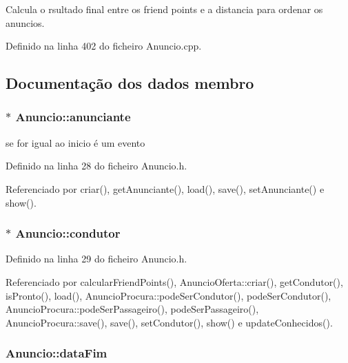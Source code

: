 Calcula o rsultado final entre os friend points e a distancia para ordenar os anuncios. 



Definido na linha 402 do ficheiro Anuncio.\+cpp.



\subsection{Documentação dos dados membro}
\hypertarget{class_anuncio_a58250bfc8ab82d4308839b1e26213a0f}{
\subsubsection[{anunciante}]{$\ast$ Anuncio\+::anunciante\hspace{0.3cm}{\ttfamily [protected]}}}\label{class_anuncio_a58250bfc8ab82d4308839b1e26213a0f}


se for igual ao inicio é um evento 



Definido na linha 28 do ficheiro Anuncio.\+h.



Referenciado por criar(), get\+Anunciante(), load(), save(), set\+Anunciante() e show().

\hypertarget{class_anuncio_a8771818ef0855c6b70e2aca6c89e3177}{
\subsubsection[{condutor}]{$\ast$ Anuncio\+::condutor\hspace{0.3cm}{\ttfamily [protected]}}}\label{class_anuncio_a8771818ef0855c6b70e2aca6c89e3177}


Definido na linha 29 do ficheiro Anuncio.\+h.



Referenciado por calcular\+Friend\+Points(), Anuncio\+Oferta\+::criar(), get\+Condutor(), is\+Pronto(), load(), Anuncio\+Procura\+::pode\+Ser\+Condutor(), pode\+Ser\+Condutor(), Anuncio\+Procura\+::pode\+Ser\+Passageiro(), pode\+Ser\+Passageiro(), Anuncio\+Procura\+::save(), save(), set\+Condutor(), show() e update\+Conhecidos().

\hypertarget{class_anuncio_ac3b9182cc541cb68215f8aa09fb0e11a}{
\subsubsection[{data\+Fim}]{ Anuncio\+::data\+Fim\hspace{0.3cm}{\ttfamily [protected]}}}\label{class_anuncio_ac3b9182cc541cb68215f8aa09fb0e11a}


